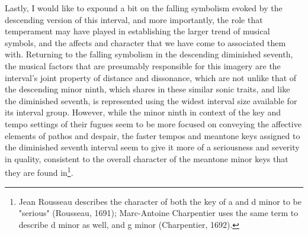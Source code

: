 Lastly, I would like to expound a bit on the falling symbolism evoked by
the descending version of this interval, and more importantly, the role
that temperament may have played in establishing the larger trend of
musical symbols, and the affects and character that we have come to
associated them with. Returning to the falling symbolism in the
descending diminished seventh, the musical factors that are presumably
responsible for this imagery are the interval's joint property of
distance and dissonance, which are not unlike that of the descending
minor ninth, which shares in these similar sonic traits, and like the
diminished seventh, is represented using the widest interval size
available for its interval group. However, while the minor ninth in
context of the key and tempo settings of their fugues seem to be more
focused on conveying the affective elements of pathos and despair, the
faster tempos and meantone keys assigned to the diminished seventh
interval seem to give it more of a seriousness and severity in quality,
consistent to the overall character of the meantone minor keys that they
are found
in\footnote{Jean Rousseau describes the character of both the key of a and d minor to be "serious" (Rousseau, 1691); Marc-Antoine Charpentier uses the same term to describe d minor as well, and g minor (Charpentier, 1692).}.

